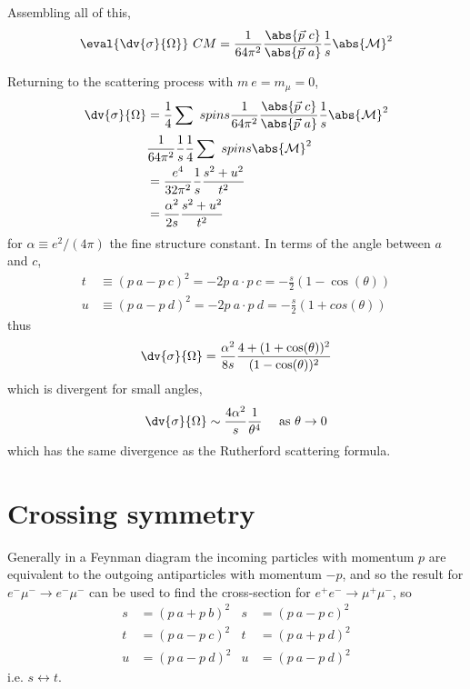 Assembling all of this,
\begin{equation}
  \eval{\dv{\sigma}{\Omega}}~{CM} = \frac{1}{64 \pi^2} \frac{\abs{\vec{p}~c}}{\abs{\vec{p}~a}} \frac{1}{s} \abs{\mathcal{M}}^2
\end{equation}

Returning to the scattering process with $m~e = m_{\mu} = 0$,
\begin{align*}
  \dv{\sigma}{\Omega} &= \frac{1}{4} \sum~{spins} \frac{1}{64 \pi^2} \frac{\abs{\vec{p}~c}}{\abs{\vec{p}~a}} \frac{1}{s} \abs{\mathcal{M}}^2 \\
& \frac{1}{64 \pi^2} \frac{1}{s} \frac{1}{4} \sum~{spins} \abs{\mathcal{M}}^2 \\
&= \frac{e^4}{32 \pi^2} \frac{1}{s} \frac{s^2 + u^2}{t^2} \\
&= \frac{\alpha^2}{2s} \frac{s^2 + u^2}{t^2}
\end{align*}
for $\alpha \equiv e^2/(4 \pi)$ the fine structure constant. In terms of the angle between $a$ and $c$,
\begin{align*}
  t& \equiv (p~a - p~c)^2 = -2 p~a \cdot p~c = -\frac{s}{2}(1-\cos(\theta))\\
u & \equiv (p~a - p~d)^2 = - 2p~a \cdot p~d = - \frac{s}{2}(1+cos(\theta))
\end{align*}
thus
\begin{equation}
  \dv{\sigma}{\Omega} = \frac{\alpha^2}{8s} \frac{4 + (1+\cos(\theta))^2}{(1-\cos(\theta))^2}
\end{equation}
which is divergent for small angles,
\[ \dv{\sigma}{\Omega} \sim \frac{4 \alpha^2}{s} \frac{1}{\theta^4}
\quad \text{ as $\theta \to 0$} \]
which has the same divergence as the Rutherford scattering formula.

\section{Crossing symmetry}
\label{sec:crossing-symmetry}

Generally in a Feynman diagram the incoming particles with momentum
$p$ are equivalent to the outgoing antiparticles with momentum $-p$,
and so the result for $e^- \mu^- \to e^- \mu^-$ can be used to find
the cross-section for $e^+ e^- \to \mu^+ \mu^-$, so
\begin{align*}
  s &= (p~a + p~b)^2 & s &= (p~a - p~c)^2 \\
t &= (p~a - p~c)^2 & t &= (p~a + p~d)^2 \\
u &= (p~a - p~d)^2 & u &= (p~a - p~d)^2
\end{align*}
i.e. $s \leftrightarrow t$. 

